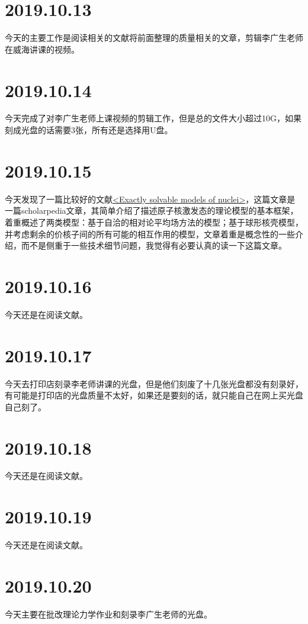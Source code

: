 \section{2019.10.13}
今天的主要工作是阅读相关的文献将前面整理的质量相关的文章，剪辑李广生老师在威海讲课的视频。

\section{2019.10.14}
今天完成了对李广生老师上课视频的剪辑工作，但是总的文件大小超过10G，如果刻成光盘的话需要3张，所有还是选择用U盘。

\section{2019.10.15}
今天发现了一篇比较好的文献\href{https://www.doi.org/10.4249/scholarpedia.31279}{<Exactly solvable models of nuclei>}\cite{RN1176}，这篇文章是一篇scholarpedia文章，其简单介绍了描述原子核激发态的理论模型的基本框架，着重概述了两类模型：基于自洽的相对论平均场方法的模型；基于球形核壳模型，并考虑剩余的价核子间的所有可能的相互作用的模型，文章着重是概念性的一些介绍，而不是侧重于一些技术细节问题，我觉得有必要认真的读一下这篇文章。

\section{2019.10.16}
今天还是在阅读文献\cite{RN1176}。

\section{2019.10.17}
今天去打印店刻录李老师讲课的光盘，但是他们刻废了十几张光盘都没有刻录好，有可能是打印店的光盘质量不太好，如果还是要刻的话，就只能自己在网上买光盘自己刻了。

\section{2019.10.18}
今天还是在阅读文献\cite{RN1176}。

\section{2019.10.19}
今天还是在阅读文献\cite{RN1176}。

\section{2019.10.20}
今天主要在批改理论力学作业和刻录李广生老师的光盘。


